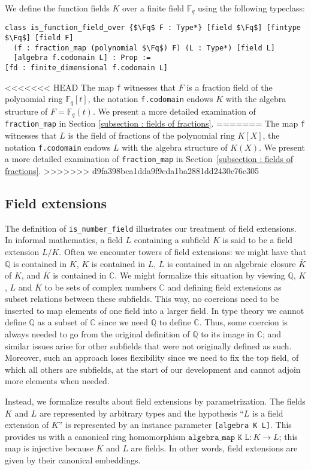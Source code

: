 \documentclass[a4paper,USenglish,cleveref, autoref, thm-restate]{lipics-v2021}
\newcommand{\C}{\mathbb{C}}
\newcommand{\lean}[1]{\texttt{#1}\xspace} %
\newcommand*{\Fq}[1][q]{\mathbb{F}_{#1}}
\newcommand{\Q}{\mathbb{Q}}
\begin{document}
We define the function fields $K$ over a finite field $\Fq$ using the following typeclass:
\begin{lstlisting}
class is_function_field_over {$\Fq$ F : Type*} [field $\Fq$] [fintype $\Fq$] [field F]
  (f : fraction_map (polynomial $\Fq$) F) (L : Type*) [field L]
  [algebra f.codomain L] : Prop :=
[fd : finite_dimensional f.codomain L]
\end{lstlisting}
<<<<<<< HEAD
The map \lean{f} witnesses that $F$ is a fraction field of the polynomial ring $\Fq[q][t]$,
the notation \lean{f.codomain} endows $K$ with the algebra structure of $F=\Fq(t)$. We present a more detailed examination of \lean{fraction\_map} in Section \ref{subsection : fields of fractions}.
=======
The map \lean{f} witnesses that $L$ is the field of fractions of the polynomial ring $K[X]$,
the notation \lean{f.codomain} endows $L$ with the algebra structure of $K(X)$.
We present a more detailed examination of \lean{fraction\_map} in Section~\ref{subsection : fields of fractions}.
>>>>>>> d9fa398bca1dda9f9cda1ba2881dd2430c76c305

\subsection{Field extensions}

The definition of \lean{is\_number\_field} illustrates our treatment of field extensions.
In informal mathematics, a field $L$ containing a subfield $K$ is said to be a field extension $L / K$.
Often we encounter towers of field extensions: we might have that $\Q$ is contained in $K$, $K$ is contained in $L$, $L$ is contained in an algebraic closure $\bar{K}$ of $K$, and $\bar{K}$ is contained in $\C$.
We might formalize this situation by viewing $\Q$, $K$, $L$ and $\bar{K}$ to be sets of complex numbers $\C$ and defining field extensions as subset relations between these subfields.
This way, no coercions need to be inserted to map elements of one field into a larger field.
In type theory we cannot define $\Q$ as a subset of $\C$ since we need $\Q$ to define $\C$.
Thus, some coercion is always needed to go from the original definition of $\Q$ to its image in $\C$; and similar issues arise for other subfields that were not originally defined as such.
Moreover, such an approach loses flexibility since we need to fix the top field, of which all others are subfields, at the start of our development and cannot adjoin more elements when needed.

Instead, we formalize results about field extensions by parametrization. The fields $K$ and $L$ are represented by arbitrary types
and the hypothesis ``$L$ is a field extension of $K$'' is represented by an instance parameter \lean{[algebra K L]}. This provides us with a canonical ring homomorphism $\lean{algebra\_map K L} : K \to L$; this map is injective because $K$ and $L$ are fields.
In other words, field extensions are given by their canonical embeddings.
\end{document}
